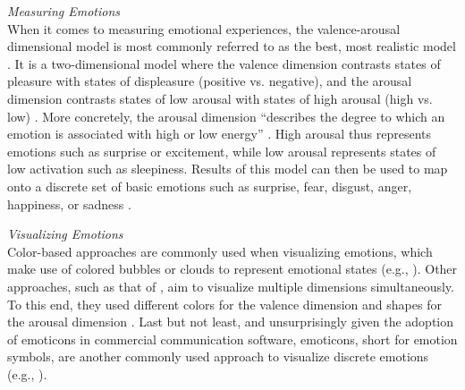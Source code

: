 \medskip\noindent\textit{Measuring Emotions}\\
When it comes to measuring emotional experiences, the valence-arousal dimensional model is most commonly referred to as the best, most realistic model \autocite{russell1980circumplex, mauss2009measures}. It is a two-dimensional model where the valence dimension contrasts states of pleasure with states of displeasure (positive vs. negative), and the arousal dimension contrasts states of low arousal with states of high arousal (high vs. low) \autocite{mauss2009measures}. More concretely, the arousal dimension \enquote{describes the degree to which an emotion is associated with high or low energy} \autocite[p.~1334]{tseng2014using}. High arousal thus represents emotions such as surprise or excitement, while low arousal represents states of low activation such as sleepiness. Results of this model can then be used to map onto a discrete set of basic emotions such as surprise, fear, disgust, anger, happiness, or sadness \autocite{brave2007emotion}.

\medskip\noindent\textit{Visualizing Emotions}\\
Color-based approaches are commonly used when visualizing emotions, which make use of colored bubbles or clouds to represent emotional states (e.g., \autocite{church2010study, kempter2014emotionwatch, guzman2013visualizing}). Other approaches, such as that of \textcite{mcduff2012affectaura}, aim to visualize multiple dimensions simultaneously. To this end, they used different colors for the valence dimension and shapes for the arousal dimension \autocite{mcduff2012affectaura}. Last but not least, and unsurprisingly given the adoption of emoticons in commercial communication software, emoticons, short for emotion symbols, are another commonly used approach to visualize discrete emotions (e.g., \autocite{garcia1999emotional, sanchez2006conveying}).